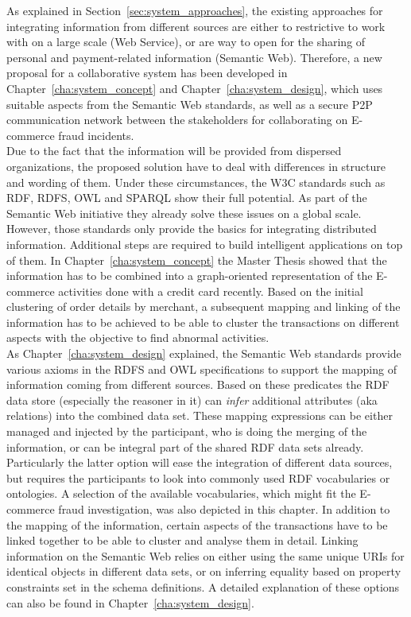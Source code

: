 As explained in Section~\ref{sec:system_approaches}, the existing approaches for integrating information from different sources are either to restrictive to work with on a large scale (Web Service), or are way to open for the sharing of personal and payment-related information (Semantic Web). Therefore, a new proposal for a collaborative system has been developed in Chapter~\ref{cha:system_concept} and Chapter~\ref{cha:system_design}, which uses suitable aspects from the Semantic Web standards, as well as a secure \gls{P2P} communication network between the stakeholders for collaborating on \gls{E-commerce} fraud incidents. \\

Due to the fact that the information will be provided from dispersed organizations, the proposed solution have to deal with differences in structure and wording of them. Under these circumstances, the \gls{W3C} standards such as \gls{RDF}, \gls{RDFS}, \gls{OWL} and \gls{SPARQL} show their full potential. As part of the Semantic Web initiative they already solve these issues on a global scale. However, those standards only provide the basics for integrating distributed information. Additional steps are required to build intelligent applications on top of them. In Chapter~\ref{cha:system_concept} the Master Thesis showed that the information has to be combined into a graph-oriented representation of the \gls{E-commerce} activities done with a credit card recently. Based on the initial clustering of order details by merchant, a subsequent mapping and linking of the information has to be achieved to be able to cluster the transactions on different aspects with the objective to find abnormal activities. \\

As Chapter~\ref{cha:system_design} explained, the Semantic Web standards provide various axioms in the \gls{RDFS} and \gls{OWL} specifications to support the mapping of information coming from different sources. Based on these predicates the \gls{RDF} data store (especially the reasoner in it) can \emph{infer} additional attributes (aka relations) into the combined data set. These mapping expressions can be either managed and injected by the participant, who is doing the merging of the information, or can be integral part of the shared \gls{RDF} data sets already. Particularly the latter option will ease the integration of different data sources, but requires the participants to look into commonly used \gls{RDF} vocabularies or ontologies. A selection of the available vocabularies, which might fit the \gls{E-commerce} fraud investigation, was also depicted in this chapter. In addition to the mapping of the information, certain aspects of the transactions have to be linked together to be able to cluster and analyse them in detail. Linking information on the Semantic Web relies on either using the same unique \gls{URI}s for identical objects in different data sets, or on inferring equality based on property constraints set in the schema definitions. A detailed explanation of these options can also be found in Chapter~\ref{cha:system_design}. \\

